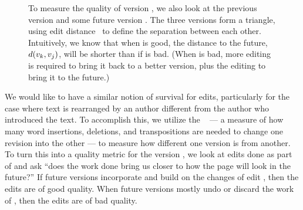 \begin{figure}[t]
\centering
{}
\hspace{1ex}
\caption{To measure the quality of version , we also
	look at the previous version  and some future
	version .
	The three versions form a triangle, using
	edit distance~\cite{Levenshtein66} to define the separation
	between each other.
	Intuitively, we know that when  is good,
	the distance to the future, $d(v_{k},v_{j})$,
	will be shorter than if  is bad.
	(When  is bad, more editing is required to
	bring it back to a better version, plus the editing
	to bring it to the future.)
}
\label{fig-editcontr}
\end{figure}

  We would like to have a similar notion of survival for edits,
  particularly for the case where text is rearranged by an author
  different from the author who introduced the text.
  To accomplish this, we utilize the
  ~\cite{Levenshtein66,TichyEditDist,EditDistanceMoves,Adler2007}
  --- a measure of how many word insertions, deletions,
  and transpositions are needed to change one revision into the other ---
  to measure how different one version is from another.
  To turn this into a quality metric for the
  version , we look at edits done as part of 
  and ask ``does the work done bring us closer to how the page
  will look in the future?''
  If future versions incorporate and build on the changes of edit ,
  then the edits are of good quality.
  When future versions mostly undo or discard the work of ,
  then the edits are of bad quality.

